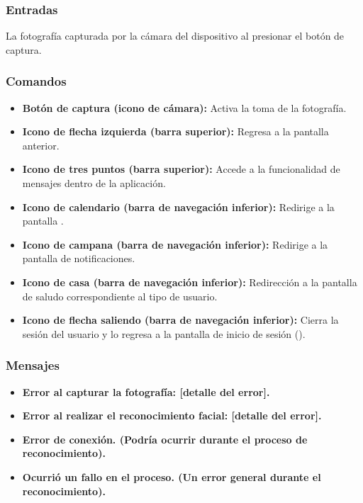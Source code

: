 \subsubsection{Entradas}
La fotografía capturada por la cámara del dispositivo al presionar el botón de captura.

\subsubsection{Comandos}
\begin{itemize}
	\item \textbf{Botón de captura (icono de cámara):} Activa la toma de la fotografía.
	\item \textbf{Icono de flecha izquierda (barra superior):} Regresa a la pantalla anterior.
	\item \textbf{Icono de tres puntos (barra superior):} Accede a la funcionalidad de mensajes dentro de la aplicación.
	\item \textbf{Icono de calendario (barra de navegación inferior):} Redirige a la pantalla .
	\item \textbf{Icono de campana (barra de navegación inferior):} Redirige a la pantalla de notificaciones.
	\item \textbf{Icono de casa (barra de navegación inferior):} Redirección a la pantalla de saludo correspondiente al tipo de usuario.
	\item \textbf{Icono de flecha saliendo (barra de navegación inferior):} Cierra la sesión del usuario y lo regresa a la pantalla de inicio de sesión ().
\end{itemize}

\subsubsection{Mensajes}
\begin{itemize}
	\item \textbf{Error al capturar la fotografía: [detalle del error].}
	\item \textbf{Error al realizar el reconocimiento facial: [detalle del error].}
	\item \textbf{Error de conexión. (Podría ocurrir durante el proceso de reconocimiento).}
	\item \textbf{Ocurrió un fallo en el proceso. (Un error general durante el reconocimiento).}
\end{itemize}